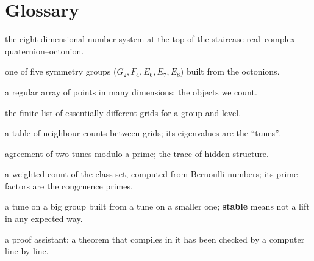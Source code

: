 \documentclass[11pt]{article}
\begin{document}
\section*{Glossary}
\begin{description}[nosep,leftmargin=1.6cm]
\item[Octonions] the eight-dimensional number system at the top of the staircase real--complex--quaternion--octonion.
\item[Exceptional group] one of five symmetry groups ($G_2,F_4,E_6,E_7,E_8$) built from the octonions.
\item[Lattice / grid] a regular array of points in many dimensions; the objects we count.
\item[Class set] the finite list of essentially different grids for a group and level.
\item[Hecke operator] a table of neighbour counts between grids; its eigenvalues are the ``tunes''.
\item[Congruence] agreement of two tunes modulo a prime; the trace of hidden structure.
\item[Mass] a weighted count of the class set, computed from Bernoulli numbers; its prime factors are the congruence primes.
\item[Lift] a tune on a big group built from a tune on a smaller one; \textbf{stable} means not a lift in any expected way.
\item[Lean] a proof assistant; a theorem that compiles in it has been checked by a computer line by line.
\end{description}
\end{document}
